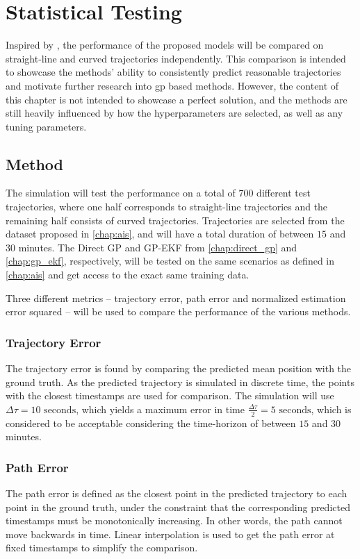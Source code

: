 \chapter{Statistical Testing}\label{chap:stat_testing}
Inspired by \cite{hexeberg}, the performance of the proposed models will be compared on straight-line and curved trajectories independently. This comparison is intended to showcase the methods' ability to consistently predict reasonable trajectories and motivate further research into \acrshort{gp} based methods. However, the content of this chapter is not intended to showcase a perfect solution, and the methods are still heavily influenced by how the hyperparameters are selected, as well as any tuning parameters.

\section{Method}

The simulation will test the performance on a total of $700$ different test trajectories, where one half corresponds to straight-line trajectories and the remaining half consists of curved trajectories. Trajectories are selected from the dataset proposed in \cref{chap:ais}, and will have a total duration of between $15$ and $30$ minutes. The Direct GP and GP-EKF from \cref{chap:direct_gp} and \cref{chap:gp_ekf}, respectively, will be tested on the same scenarios as defined in \cref{chap:ais} and get access to the exact same training data.

Three different metrics -- trajectory error, path error and normalized estimation error squared -- will be used to compare the performance of the various methods.

\subsection{Trajectory Error}
The trajectory error is found by comparing the predicted mean position with the ground truth. As the predicted trajectory is simulated in discrete time, the points with the closest timestamps are used for comparison. The simulation will use $\Delta \tau = 10\text{ seconds}$, which yields a maximum error in time $\frac{\Delta \tau}{2} = 5 \text{ seconds}$, which is considered to be acceptable considering the time-horizon of between $15$ and $30$ minutes.
\subsection{Path Error}
The path error is defined as the closest point in the predicted trajectory to each point in the ground truth, under the constraint that the corresponding predicted timestamps must be monotonically increasing. In other words, the path cannot move backwards in time. Linear interpolation is used to get the path error at fixed timestamps to simplify the comparison.

